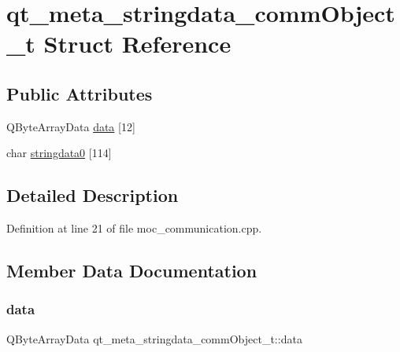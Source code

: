 \hypertarget{structqt__meta__stringdata__comm_object__t}{}\section{qt\+\_\+meta\+\_\+stringdata\+\_\+comm\+Object\+\_\+t Struct Reference}
\label{structqt__meta__stringdata__comm_object__t}
\subsection*{Public Attributes}
\begin{DoxyCompactItemize}
\item 
Q\+Byte\+Array\+Data \hyperlink{structqt__meta__stringdata__comm_object__t_ab43768190379f38a6c0c23931d8c16ba}{data} \mbox{[}12\mbox{]}
\item 
char \hyperlink{structqt__meta__stringdata__comm_object__t_a6206d59bc929b76a102101c37f263f52}{stringdata0} \mbox{[}114\mbox{]}
\end{DoxyCompactItemize}


\subsection{Detailed Description}


Definition at line 21 of file moc\+\_\+communication.\+cpp.



\subsection{Member Data Documentation}
\mbox{\label{structqt__meta__stringdata__comm_object__t_ab43768190379f38a6c0c23931d8c16ba}} 
\subsubsection{\texorpdfstring{data}{data}}
{\footnotesize\ttfamily Q\+Byte\+Array\+Data qt\+\_\+meta\+\_\+stringdata\+\_\+comm\+Object\+\_\+t\+::data}



